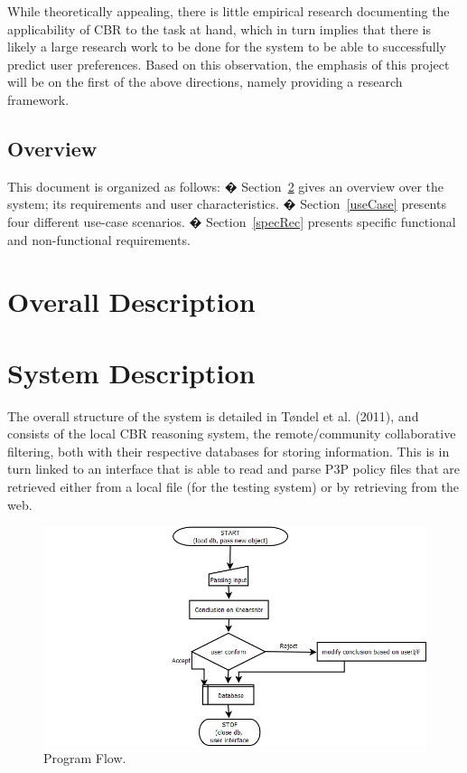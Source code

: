 While theoretically appealing, there is little empirical research documenting the applicability of CBR to the task at hand, which in turn implies that there is likely a large research work to be done for the system to be able to successfully predict user preferences. Based on this observation, the emphasis of this project will be on the first of the above directions, namely providing a research framework.

\subsection{Overview}
This document is organized as follows:
�	Section~\ref{sysDesc} gives an overview over the system; its requirements and user characteristics.
�	Section~\ref{useCase} presents four different use-case scenarios.
�	Section~\ref{specRec} presents specific functional and non-functional requirements.
\section{Overall Description}

\section{System Description}\label{sysDesc}
The overall structure of the system is detailed in T{\o}ndel et al. (2011), and consists of the local CBR reasoning system, the remote/community collaborative filtering, both with their respective databases for storing information. This is in turn linked to an interface that is able to read and parse P3P policy files that are retrieved either from a local file (for the testing system) or by retrieving from the web.

\begin{figure}[htbp]
\begin{center}
\includegraphics[width = \textwidth]{DesignReport/uml/flowchart.png}
\caption{Program Flow.}
\label{ReqSpecFlow}
\end{center}
\end{figure}

